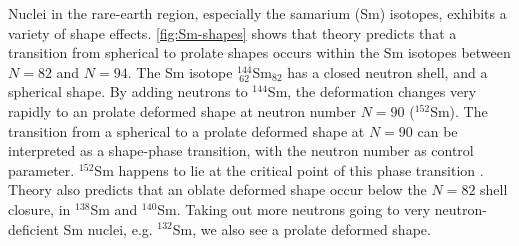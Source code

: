 \documentclass[twoside,english]{uiofysmaster/uiofysmaster}
\let\orgautoref\autoref
\renewcommand{\autoref}
        {%
		 \def\sectionautorefname{Section}%
		 \def\subsectionautorefname{Section}%
		 \def\subsubsectionautorefname{Section}%
		 \def\chapterautorefname{Chapter}%
          \orgautoref}
\begin{document}
Nuclei in the rare-earth region, especially the samarium (Sm) isotopes, exhibits a variety of shape effects. 
\autoref{fig:Sm-shapes} shows that theory predicts that a transition from spherical to prolate shapes occurs within the Sm isotopes between $N = 82$ and $N = 94$.
The Sm isotope $^{144}_{~62}$Sm$_{82}$ has a closed neutron shell, and a spherical shape.
By adding neutrons to $^{144}$Sm, the deformation changes very rapidly to an prolate deformed shape at neutron number $N = 90$ ($^{152}$Sm). 
The transition from a spherical to a prolate deformed shape at $N = 90$ can be interpreted as a shape-phase transition, with the neutron number as control parameter. 
$^{152}$Sm happens to lie at the critical point of this phase transition \cite{Casten2001}.
Theory also predicts that an oblate deformed shape occur below the $N = 82$ shell closure, in $^{138}$Sm and $^{140}$Sm. 
Taking out more neutrons going to very neutron-deficient Sm nuclei, e.g. $^{132}$Sm, we also see a prolate deformed shape. 
\end{document}
